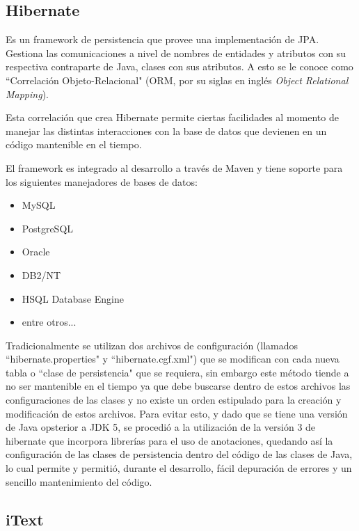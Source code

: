         \subsection{Hibernate}
        \label{tecno-hibernate}
        
        Es un framework de persistencia que provee una implementación de JPA\cite{HIBERNATE-basico}. Gestiona las comunicaciones a nivel de nombres de entidades y atributos con su respectiva contraparte de Java, clases con sus atributos. A esto se le conoce como ``Correlación Objeto-Relacional" (ORM, por su siglas en inglés \textit{Object Relational Mapping}).
        
        Esta correlación que crea Hibernate permite ciertas facilidades al momento de manejar las distintas interacciones con la base de datos que devienen en un código mantenible en el tiempo.
        
        El framework es integrado al desarrollo a través de Maven y tiene soporte para los siguientes manejadores de bases de datos\cite{HIBERNATE-tutorial}: 
        \begin{itemize}
            \item MySQL
            \item PostgreSQL
            \item Oracle
            \item DB2/NT
            \item HSQL Database Engine
            \item entre otros...
        \end{itemize}
        
        Tradicionalmente se utilizan dos archivos de configuración (llamados ``hibernate.properties" y ``hibernate.cgf.xml") que se modifican con cada nueva tabla o ``clase de persistencia" que se requiera, sin embargo este método tiende a no ser mantenible en el tiempo ya que debe buscarse dentro de estos archivos las configuraciones de las clases y no existe un orden estipulado para la creación y modificación de estos archivos. Para evitar esto, y dado que se tiene una versión de Java opsterior a JDK 5, se procedió a la utilización de la versión 3 de hibernate que incorpora librerías para el uso de anotaciones, quedando así la configuración de las clases de persistencia dentro del código de las clases de Java, lo cual permite y permitió, durante el desarrollo, fácil depuración de errores y un sencillo mantenimiento del código.
        
        \subsection{iText}
        \label{tecno-itext}
        
